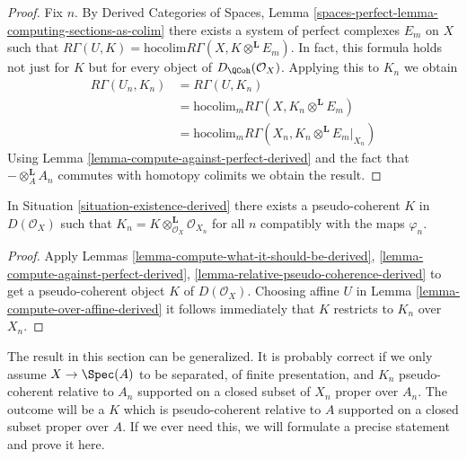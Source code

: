 \begin{proof}
Fix $n$. By Derived Categories of Spaces, Lemma
\ref{spaces-perfect-lemma-computing-sections-as-colim}
there exists a system of perfect complexes $E_m$
on $X$ such that
$R\Gamma(U, K) = \text{hocolim} R\Gamma(X, K \otimes^\mathbf{L} E_m)$.
In fact, this formula holds not just for $K$ but for every object of
$D_\QCoh(\mathcal{O}_X)$.
Applying this to $K_n$
we obtain
\begin{align*}
R\Gamma(U_n, K_n)
& =
R\Gamma(U, K_n) \\
& =
\text{hocolim}_m R\Gamma(X, K_n \otimes^\mathbf{L} E_m) \\
& =
\text{hocolim}_m R\Gamma(X_n, K_n \otimes^\mathbf{L} E_m|_{X_n})
\end{align*}
Using Lemma \ref{lemma-compute-against-perfect-derived}
and the fact that $- \otimes_A^\mathbf{L} A_n$
commutes with homotopy colimits we obtain the result.
\end{proof}

\begin{theorem}
\label{theorem-existence-derived}
In Situation \ref{situation-existence-derived}
there exists a pseudo-coherent $K$ in $D(\mathcal{O}_X)$
such that $K_n = K \otimes_{\mathcal{O}_X}^\mathbf{L} \mathcal{O}_{X_n}$
for all $n$ compatibly with the maps $\varphi_n$.
\end{theorem}

\begin{proof}
Apply Lemmas \ref{lemma-compute-what-it-should-be-derived},
\ref{lemma-compute-against-perfect-derived},
\ref{lemma-relative-pseudo-coherence-derived}
to get a pseudo-coherent object $K$ of $D(\mathcal{O}_X)$.
Choosing affine $U$ in Lemma
\ref{lemma-compute-over-affine-derived}
it follows immediately that $K$ restricts to $K_n$ over $X_n$.
\end{proof}

\begin{remark}
\label{remark-correct-generality}
The result in this section can be generalized. It is probably correct
if we only assume $X \to \Spec(A)$ to be separated, of finite presentation,
and $K_n$ pseudo-coherent relative to $A_n$ supported on a closed
subset of $X_n$ proper over $A_n$. The outcome will be a $K$ which
is pseudo-coherent relative to $A$ supported on a closed subset
proper over $A$. If we ever need this, we will
formulate a precise statement and prove it here.
\end{remark}

















